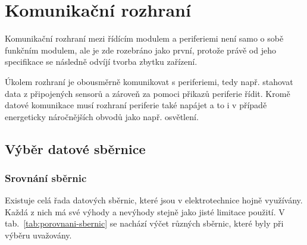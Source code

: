 \section{Komunikační rozhraní}
\label{sec:komunikacni-rozhrani}
    Komunikační rozhraní mezi řídícím modulem a periferiemi není samo o sobě funkčním modulem, ale je zde rozebráno jako první, protože právě od jeho specifikace se následně odvíjí tvorba zbytku zařízení. 

    Úkolem rozhraní je obousměrně komunikovat s periferiemi, tedy např. stahovat data z připojených sensorů a zároveň za pomoci přikazů periferie řídit. Kromě datové komunikace musí rozhraní periferie také napájet a to i v případě energeticky náročnějších obvodů jako např. osvětlení. 
    
    \subsection{Výběr datové sběrnice}
    \subsubsection{Srovnání sběrnic}
        Existuje celá řada datových sběrnic, které jsou v elektrotechnice hojně využívány. Každá z nich má své výhody a nevýhody stejně jako jisté limitace použití. V tab.~\ref{tab:porovnani-sbernic} se nachází výčet různých sběrnic, které byly při výběru uvažovány. 

